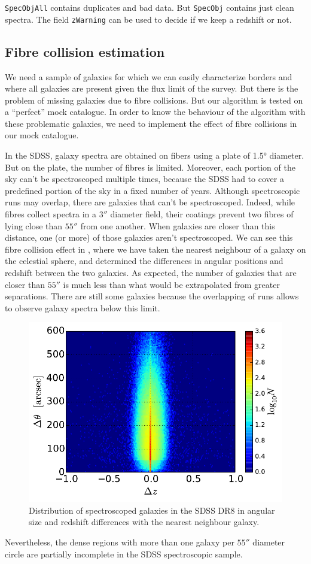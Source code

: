 \texttt{SpecObjAll} contains duplicates and bad data. But \texttt{SpecObj}
contains just clean spectra. The field \texttt{zWarning} can be used to decide
if we keep a redshift or not.

\subsection{Fibre collision estimation}

We need a sample of galaxies for which we can easily characterize borders and
where all galaxies are present given the flux limit of the survey. But there is
the problem of missing galaxies due to fibre collisions. But our algorithm is
tested on a ``perfect'' mock catalogue. In order to know the behaviour of the
algorithm with these problematic galaxies, we need to implement the effect of
fibre collisions in our mock catalogue.

In the SDSS, galaxy spectra are obtained on fibers using a plate of 1.5°
diameter. But on the plate, the number of fibres is limited. Moreover, each
portion of the sky can't be spectroscoped multiple times, because the SDSS
had to cover a predefined portion of the sky in a fixed number of years.
Although spectroscopic runs may overlap, there are galaxies that can't be
spectroscoped. Indeed, while fibres collect spectra in a $3''$ diameter field,
their coatings prevent two fibres of lying close than $55''$ from one another.
When galaxies are closer than this distance, one (or more) of those galaxies
aren't spectroscoped. We can see this fibre collision effect in
, where we have taken the nearest neighbour of a galaxy on
the celestial sphere, and determined the differences in angular positions and
redshift between the two galaxies. As expected, the number of galaxies that are
closer than $55''$ is much less than what would be extrapolated from greater
separations. There are still some galaxies because the overlapping of runs
allows to observe galaxy spectra below this limit.

\begin{figure}[ht] \centering
    \includegraphics[width=0.6\linewidth]{figures/sdss/plane.pdf}
    \caption{\footnotesize{}Distribution of spectroscoped galaxies in the SDSS
    DR8 in angular size and redshift differences with the nearest neighbour
galaxy.\label{fig:plane}} \end{figure}
%
Nevertheless, the dense regions with more than one galaxy per $55''$ diameter
circle are partially incomplete in the SDSS spectroscopic sample.

